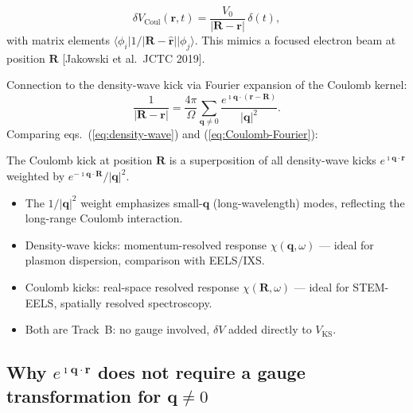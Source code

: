 \documentclass[11pt]{article}
\newcommand{\iunit}{\imath}
\newcommand{\rhat}{\hat{\mathbf{r}}}
\newcommand{\VKS}{V_{\mathrm{KS}}}
\begin{document}
\begin{equation}
  \delta V_\mathrm{Coul}(\mathbf{r},t)
  = \frac{V_0}{|\mathbf{R}-\mathbf{r}|}\,\delta(t),
  \label{eq:Coulomb-kick}
\end{equation}
with matrix elements
$\langle\phi_i|1/|\mathbf{R}-\rhat||\phi_j\rangle$.
This mimics a focused electron beam at position $\mathbf{R}$
[Jakowski et al.\ JCTC 2019].

Connection to the density-wave kick via Fourier expansion of the
Coulomb kernel:
\begin{equation}
  \frac{1}{|\mathbf{R}-\mathbf{r}|}
  = \frac{4\pi}{\Omega}
    \sum_{\mathbf{q}\neq0}
    \frac{e^{\iunit\mathbf{q}\cdot(\mathbf{r}-\mathbf{R})}}{|\mathbf{q}|^2}.
  \label{eq:Coulomb-Fourier}
\end{equation}
Comparing eqs.~(\ref{eq:density-wave}) and (\ref{eq:Coulomb-Fourier}):

\begin{keyresult}
The Coulomb kick at position $\mathbf{R}$ is a superposition of
all density-wave kicks $e^{\iunit\mathbf{q}\cdot\mathbf{r}}$
weighted by $e^{-\iunit\mathbf{q}\cdot\mathbf{R}}/|\mathbf{q}|^2$.
\begin{itemize}
  \item The $1/|\mathbf{q}|^2$ weight emphasizes small-$\mathbf{q}$
    (long-wavelength) modes, reflecting the long-range Coulomb
    interaction.
  \item Density-wave kicks: momentum-resolved response
    $\chi(\mathbf{q},\omega)$ --- ideal for plasmon dispersion,
    comparison with EELS/IXS.
  \item Coulomb kicks: real-space resolved response
    $\chi(\mathbf{R},\omega)$ --- ideal for STEM-EELS, spatially
    resolved spectroscopy.
  \item Both are Track~B: no gauge involved, $\delta V$ added
    directly to $\VKS$.
\end{itemize}
\end{keyresult}

\subsection{Why $e^{\iunit\mathbf{q}\cdot\mathbf{r}}$ does not
  require a gauge transformation for $\mathbf{q}\neq0$}
\end{document}
